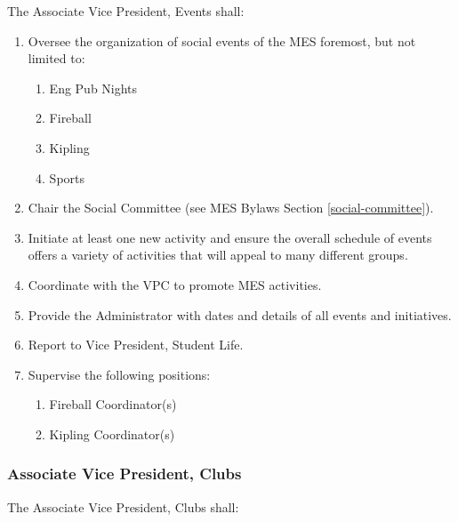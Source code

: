 The Associate Vice President, Events shall:

\begin{enumerate}
 \item
  Oversee the organization of social events of the MES foremost, but not
  limited to:

  \begin{enumerate}
   \item
    Eng Pub Nights
   \item
    Fireball
   \item
    Kipling
   \item
    Sports
  \end{enumerate}
 \item
  Chair the Social Committee (see MES Bylaws Section
  \ref{social-committee}).
 \item
  Initiate at least one new activity and ensure the overall schedule of
  events offers a variety of activities that will appeal to many
  different groups.
 \item
  Coordinate with the VPC to promote MES activities.
 \item
  Provide the Administrator with dates and details of all events and
  initiatives.
 \item
  Report to Vice President, Student Life.
 \item
  Supervise the following positions:

  \begin{enumerate}
   \item
    Fireball Coordinator(s)
   \item
    Kipling Coordinator(s)

  \end{enumerate}
\end{enumerate}

\subsubsection{Associate Vice President,
 Clubs}
\label{associate-vice-president-clubs}
The Associate Vice President, Clubs shall:

